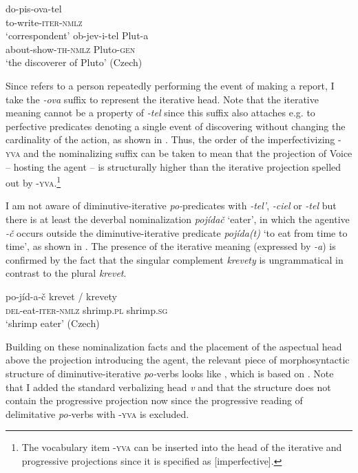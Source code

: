 \documentclass[output=paper,colorlinks,citecolor=brown]{langscibook}
\begin{document}
\ea\label{biskup:ex:ctyritri}\ea\gll do-pis-ova-tel\\
to-write-\textsc{iter-nmlz}\\
\glt ‘correspondent’ \label{biskup:ex:ctyritri.a}
\ex\gll ob-jev-i-tel Plut-a\\
about-show-\textsc{th-nmlz} Pluto-\textsc{gen}\\
\glt ‘the discoverer of Pluto’ \hfill (Czech) \label{biskup:ex:ctyritri.b}
\z\z

\noindent Since  refers to a person repeatedly performing the event of making a report, I take the \textit{-ova} suffix to represent the iterative head. Note that the iterative meaning cannot be a property of \textit{-tel} since this suffix also attaches e.g. to perfective predicates denoting a single event of discovering without changing the cardinality of the action, as shown in . Thus, the order of the imperfectivizing \textsc{-yva} and the nominalizing suffix can be taken to mean that the projection of Voice -- hosting the agent -- is structurally higher than the iterative projection spelled out by \textsc{-yva}.\footnote{  The vocabulary item \textsc{-yva} can be inserted into the head of the iterative and progressive projections since it is specified as [imperfective].}

I am not aware of diminutive-iterative \textit{po-}predicates with \textit{-tel’}, \textit{-ciel} or \textit{-tel} but there is at least the deverbal nominalization \textit{pojídač} ‘eater’, in which the agentive \textit{-č} occurs outside the diminutive-iterative predicate \textit{pojída(t)} ‘to eat from time to time’, as shown in . The presence of the iterative meaning (expressed by \textit{-a}) is confirmed by the fact that the singular complement \textit{krevety} is ungrammatical in contrast to the plural \textit{krevet}.

\ea\label{biskup:ex:pojidat}\gll po-jíd-a-č krevet / \minsp{*} krevety\\
\textsc{del}-eat-\textsc{iter-nmlz} shrimp.\textsc{pl} {} {} shrimp.\textsc{sg}\\
\glt ‘shrimp eater’ \hfill (Czech)
\z

\noindent Building on these nominalization facts and the placement of the aspectual head above the projection introducing the agent, the relevant piece of morphosyntactic structure of diminutive-iterative \textit{po-}verbs looks like , which is based on . Note that I added the standard verbalizing head \textit{v} and that the structure does not contain the progressive projection now since the progressive reading of delimitative \textit{po-}verbs with \textsc{-yva} is excluded.
\end{document}
